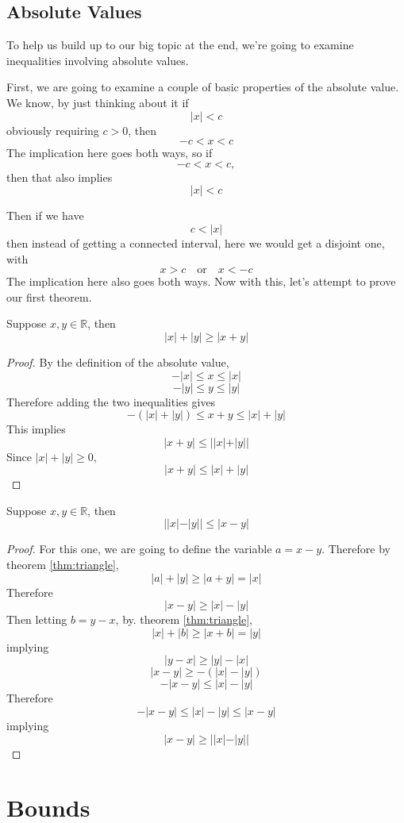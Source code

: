 \documentclass[11pt]{article}
\numberwithin{lemma}{section}
\numberwithin{equation}{section}
\numberwithin{define}{section}
\numberwithin{prop}{section}
\numberwithin{figure}{section}
\numberwithin{theorem}{section}
\numberwithin{cor}{section}
\newcounter{ex}[section]
\numberwithin{ex}{section}
\def\real{\mathbb{R}}
\def\jor{\quad\text{or}\quad}
\begin{document}
\subsection{Absolute Values}
To help us build up to our big topic at the end, we're going to examine inequalities involving absolute values.

First, we are going to examine a couple of basic properties of the absolute value. We know, by just thinking about it if
$$|x|<c$$
obviously requiring $c>0$, then
$$-c<x<c$$
The implication here goes both ways, so if
$$-c<x<c,$$
then that also implies
$$|x|<c$$

Then if we have
$$c<|x|$$
then instead of getting a connected interval, here we would get a disjoint one, with
$$x>c \jor x < -c$$
The implication here also goes both ways. Now with this, let's attempt to prove our first theorem.

\begin{theorem}
	Suppose $x,y\in\real$, then
	$$|x|+|y|\ge |x+y|$$
	\label{thm:triangle}
\end{theorem}
\begin{proof}
	By the definition of the absolute value,
	$$-|x|\le x \le |x|$$
	$$-|y|\le y \le |y|$$
	Therefore adding the two inequalities gives
	$$-(|x|+|y|)\le x+y \le |x|+|y|$$
	This implies
	$$|x+y|\le ||x|+|y||$$
	Since $|x|+|y|\ge 0$,
	$$|x+y|\le |x|+|y|$$
\end{proof}

\begin{cor}
	Suppose $x,y\in\real$, then
	$$||x|-|y||\le |x-y|$$
	\label{cor:invtri}
\end{cor}
\begin{proof}
	For this one, we are going to define the variable $a=x-y$. Therefore by theorem \eqref{thm:triangle},
	$$|a|+|y|\ge|a+y|=|x|$$
	Therefore
	$$|x-y|\ge |x|-|y|$$
	Then letting $b=y-x$, by. theorem \eqref{thm:triangle},
	$$|x|+|b|\ge|x+b|=|y|$$
	implying
	$$|y-x|\ge|y|-|x|$$
	$$|x-y|\ge-(|x|-|y|)$$
	$$-|x-y|\le |x|-|y|$$
	Therefore
	$$-|x-y|\le |x|-|y|\le |x-y|$$
	implying
	$$|x-y|\ge ||x|-|y||$$
\end{proof}

\section{Bounds}
\end{document}
